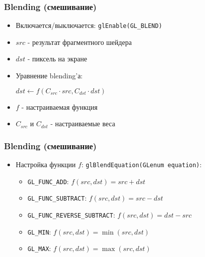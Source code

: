 \documentclass{beamer}
\begin{document}
\begin{frame}[fragile]
\frametitle{Blending (смешивание)}
\begin{itemize}
\item Включается/выключается: \verb|glEnable(GL_BLEND)|
\pause
\item \begin{math}src\end{math} - результат фрагментного шейдера
\item \begin{math}dst\end{math} - пиксель на экране
\item Уравнение blending'а:
\begin{center}
\begin{math}
dst \leftarrow f(C_{src} \cdot src, C_{dst} \cdot dst)
\end{math}
\end{center}
\pause
\item \begin{math}f\end{math} - настраиваемая функция
\item \begin{math}C_{src}\end{math} и \begin{math}C_{dst}\end{math} - настраиваемые веса
\end{itemize}
\end{frame}

\begin{frame}[fragile]
\frametitle{Blending (смешивание)}
\begin{itemize}
\item Настройка функции \begin{math}f\end{math}: \verb|glBlendEquation(GLenum equation)|:
\pause
\begin{itemize}
\item \verb|GL_FUNC_ADD|: \begin{math}f(src, dst) = src + dst\end{math}
\item \verb|GL_FUNC_SUBTRACT|: \begin{math}f(src, dst) = src - dst\end{math}
\item \verb|GL_FUNC_REVERSE_SUBTRACT|: \begin{math}f(src, dst) = dst - src\end{math}
\item \verb|GL_MIN|: \begin{math}f(src, dst) = \min(src, dst)\end{math}
\item \verb|GL_MAX|: \begin{math}f(src, dst) = \max(src, dst)\end{math}
\end{itemize}
\end{itemize}
\end{frame}
\end{document}
